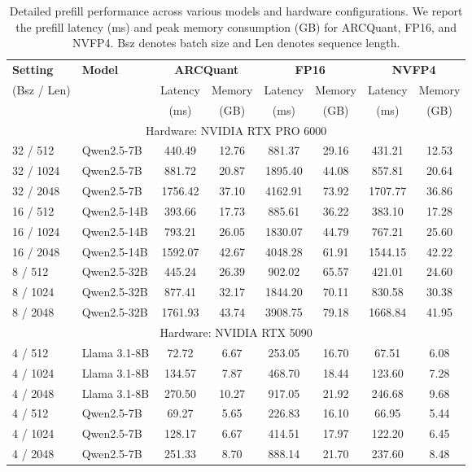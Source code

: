 \documentclass[11pt]{article}
\begin{document}
\begin{table}[t]
\centering
\caption{Detailed prefill performance across various models and hardware configurations. We report the prefill latency (ms) and peak memory consumption (GB) for ARCQuant, FP16, and NVFP4. Bsz denotes batch size and Len denotes sequence length.}
\label{tab:prefill_performance_appendix}
\begin{tabular}{ll|cc|cc|cc}
\toprule
\textbf{Setting} & \textbf{Model} & \multicolumn{2}{c|}{\textbf{ARCQuant}} & \multicolumn{2}{c|}{\textbf{FP16}} & \multicolumn{2}{c}{\textbf{NVFP4}} \\
(Bsz / Len) & & Latency& Memory& Latency& Memory& Latency& Memory\\
 & & (ms)& (GB)& (ms)& (GB)& (ms)&(GB)\\
\midrule
\multicolumn{8}{c}{Hardware: NVIDIA RTX PRO 6000} \\
\midrule
32 / 512  & Qwen2.5-7B  & 440.49 & 12.76 & 881.37  & 29.16 & 431.21  & 12.53 \\
32 / 1024 & Qwen2.5-7B  & 881.72 & 20.87 & 1895.40 & 44.08 & 857.81  & 20.64 \\
32 / 2048 & Qwen2.5-7B  & 1756.42& 37.10 & 4162.91 & 73.92 & 1707.77 & 36.86 \\
\midrule
16 / 512  & Qwen2.5-14B & 393.66 & 17.73 & 885.61  & 36.22 & 383.10  & 17.28 \\
16 / 1024 & Qwen2.5-14B & 793.21 & 26.05 & 1830.07 & 44.79 & 767.21  & 25.60 \\
16 / 2048 & Qwen2.5-14B & 1592.07& 42.67 & 4048.28 & 61.91 & 1544.15 & 42.22 \\
\midrule
8 / 512   & Qwen2.5-32B & 445.24 & 26.39 & 902.02  & 65.57 & 421.01  & 24.60 \\
8 / 1024  & Qwen2.5-32B & 877.41 & 32.17 & 1844.20 & 70.11 & 830.58  & 30.38 \\
8 / 2048  & Qwen2.5-32B & 1761.93& 43.74 & 3908.75 & 79.18 & 1668.84 & 41.95 \\

\midrule \midrule

\multicolumn{8}{c}{Hardware: NVIDIA RTX 5090} \\
\midrule
4 / 512   & Llama 3.1-8B  & 72.72  & 6.67  & 253.05  & 16.70 & 67.51   & 6.08  \\
4 / 1024  & Llama 3.1-8B  & 134.57 & 7.87  & 468.70  & 18.44 & 123.60  & 7.28  \\
4 / 2048  & Llama 3.1-8B  & 270.50 & 10.27 & 917.05  & 21.92 & 246.68  & 9.68  \\
\midrule
4 / 512   & Qwen2.5-7B  & 69.27  & 5.65  & 226.83  & 16.10 & 66.95   & 5.44  \\
4 / 1024  & Qwen2.5-7B  & 128.17 & 6.67  & 414.51  & 17.97 & 122.20  & 6.45  \\
4 / 2048  & Qwen2.5-7B  & 251.33 & 8.70  & 888.14  & 21.70 & 237.60  & 8.48  \\
\bottomrule
\end{tabular}
\end{table}
\end{document}
